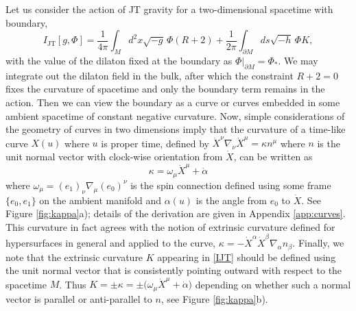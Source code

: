 \documentclass[12pt]{article}
\newcommand{\be}{\begin{equation}}
\newcommand{\ee}{\end{equation}}
\newcommand{\al}{\alpha}
\newcommand{\bt}{\beta}
\newcommand{\p}{\partial}
\begin{document}
Let us consider the action of JT gravity for a two-dimensional spacetime with boundary,
\be\label{IJT}
I_{\text{JT}}[g,\Phi]
=\frac{1}{4\pi}\int_{M}d^2x \sqrt{-g}\, \Phi( R+2)
+\frac{1}{2\pi}\int_{\p M}ds\sqrt{-h}\, \Phi K,
\ee
with the value of the dilaton fixed at the boundary as $\Phi |_{\p M}=\Phi_*$. We may integrate out the dilaton field in the bulk, after which the constraint $R+2=0$ fixes the curvature of spacetime and only the boundary term remains in the action. Then we can view the boundary as a curve or curves embedded in some ambient spacetime of constant negative curvature. Now, simple considerations of the geometry of curves in two dimensions imply that the curvature of a time-like curve $X(u)$ where $u$ is proper time, defined by $\dot{X}^{\nu}\nabla_{\nu}\dot{X}^{\mu}=\kappa n^{\mu}$ where $n$ is the unit normal vector with clock-wise orientation from $\dot{X}$, can be written as
\be \label{kappa}
\kappa=\omega_{\mu}\dot{X}^{\mu}+\dot{\alpha}
\ee
where $\omega_{\mu}=\left(e_1\right)_{\nu}\nabla_{\mu}\left(e_0\right)^{\nu}$ is the spin connection defined using some frame $\{e_0, e_1\}$ on the ambient manifold and $\alpha(u)$ is the angle from $e_0$ to $\dot{X}$. See Figure \ref{fig:kappa}a); details of the derivation are given in Appendix \ref{app:curves}. This curvature in fact agrees with the notion of extrinsic curvature defined for hypersurfaces in general and applied to the curve, $\kappa=-\dot{X}^{\al}\dot{X}^{\bt}\nabla_{\al}n_{\bt}$. Finally, we note that the extrinsic curvature $K$ appearing in \eqref{IJT} should be defined using the unit normal vector that is consistently pointing outward with respect to the spacetime $M$. Thus 
$K=\pm \kappa= \pm \big( \omega_{\mu}\dot{X}^{\mu} + \dot{\alpha}\big)$ depending on whether such a normal vector is parallel or anti-parallel to $n$, see Figure \ref{fig:kappa}b).
\end{document}
